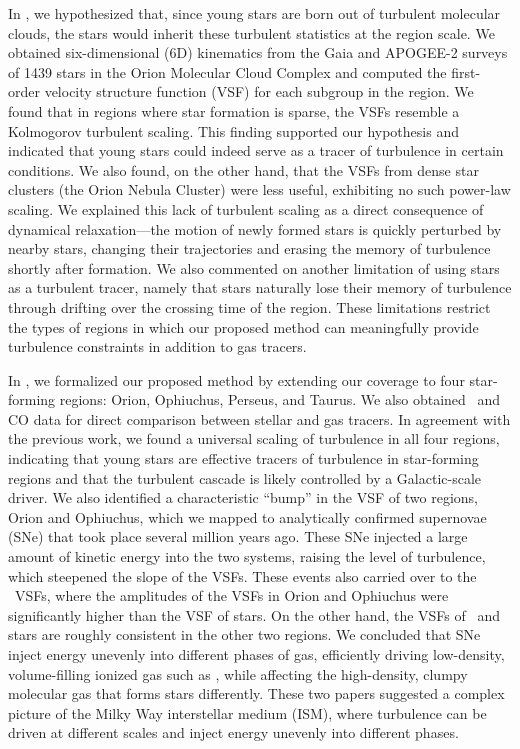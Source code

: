 In \citet{ha_measuring_2021}, we hypothesized that, since young stars are born out of turbulent molecular clouds, the stars would inherit these turbulent statistics at the region scale.
We obtained six-dimensional (6D) kinematics from the Gaia and APOGEE-2 surveys of 1439 stars in the Orion Molecular Cloud Complex and computed the first-order velocity structure function (VSF) for each subgroup in the region.
We found that in regions where star formation is sparse, the VSFs resemble a Kolmogorov turbulent scaling.
This finding supported our hypothesis and indicated that young stars could indeed serve as a tracer of turbulence in certain conditions.
We also found, on the other hand, that the VSFs from dense star clusters (the Orion Nebula Cluster) were less useful, exhibiting no such power-law scaling.
We explained this lack of turbulent scaling as a direct consequence of dynamical relaxation---the motion of newly formed stars is quickly perturbed by nearby stars, changing their trajectories and erasing the memory of turbulence shortly after formation.
We also commented on another limitation of using stars as a turbulent tracer, namely that stars naturally lose their memory of turbulence through drifting over the crossing time of the region.
These limitations restrict the types of regions in which our proposed method can meaningfully provide turbulence constraints in addition to gas tracers.

In \citet{ha_turbulence_2022}, we formalized our proposed method by extending our coverage to four star-forming regions: Orion, Ophiuchus, Perseus, and Taurus.
We also obtained \halpha\ and CO data for direct comparison between stellar and gas tracers.
In agreement with the previous work, we found a universal scaling of turbulence in all four regions, indicating that young stars are effective tracers of turbulence in star-forming regions and that the turbulent cascade is likely controlled by a Galactic-scale driver.
We also identified a characteristic ``bump'' in the VSF of two regions, Orion and Ophiuchus, which we mapped to analytically confirmed supernovae (SNe) that took place several million years ago.
These SNe injected a large amount of kinetic energy into the two systems, raising the level of turbulence, which steepened the slope of the VSFs.
These events also carried over to the \halpha\ VSFs, where the amplitudes of the VSFs in Orion and Ophiuchus were significantly higher than the VSF of stars.
On the other hand, the VSFs of \halpha\ and stars are roughly consistent in the other two regions.
We concluded that SNe inject energy unevenly into different phases of gas, efficiently driving low-density, volume-filling ionized gas such as \halpha, while affecting the high-density, clumpy molecular gas that forms stars differently.
These two papers suggested a complex picture of the Milky Way interstellar medium (ISM), where turbulence can be driven at different scales and inject energy unevenly into different phases.

